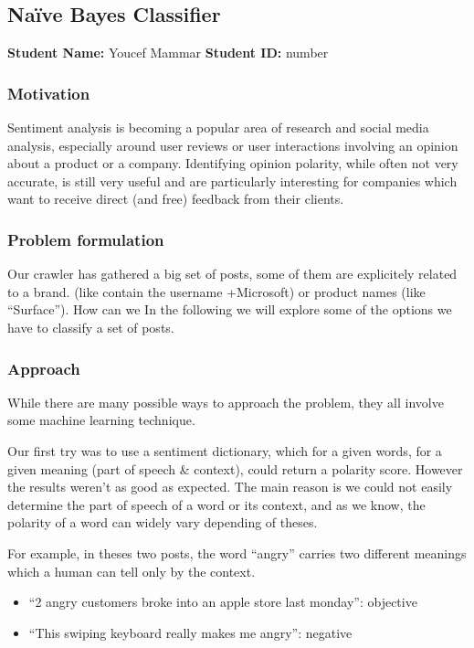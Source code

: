 \subsection{Naïve Bayes Classifier}
\textbf{Student Name: }Youcef Mammar \textbf{Student ID:} number\\

\subsubsection*{Motivation}
Sentiment analysis is becoming a popular area of research and social media analysis, 
especially around user reviews or user interactions involving an opinion about a product 
or a company. Identifying opinion polarity, while often not very accurate, is still very 
useful and are particularly interesting for companies which want to receive direct (and free) 
feedback from their clients.

\subsubsection*{Problem formulation}
Our crawler has gathered a big set of posts, some of them are explicitely related to a brand. 
(like contain the username +Microsoft) or product names (like “Surface”). How can we 
In the following we will explore some of the options we have to classify a set of posts. 



\subsubsection*{Approach}

While there are many possible ways to approach the problem, they all involve some machine learning technique.

Our first try was to use a sentiment dictionary, which for a given words, for a given meaning (part of speech \& 
context), could return a polarity score. However the results weren’t as good as expected. The main reason is we 
could not easily determine the part of speech of a word or its context, and as we know, the polarity of a word can widely vary depending of theses.

For example, in theses two posts, the word “angry” carries two different meanings which a human can tell only by the context. 
\begin{itemize}
 \item ``2 angry customers broke into an apple store last monday'': objective
 \item ``This swiping keyboard really makes me angry'': negative

\end{itemize}


